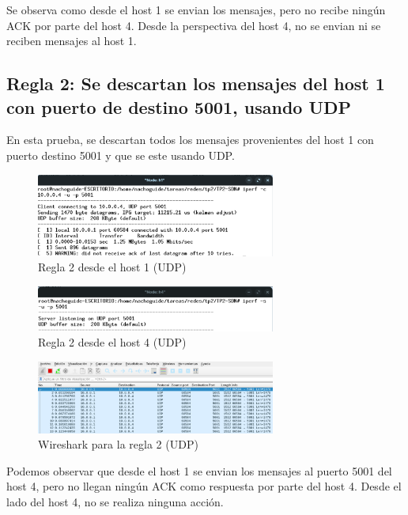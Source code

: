 \documentclass[titlepage,a4paper]{article}
\begin{document}
Se observa como desde el host 1 se envian los mensajes, pero no recibe ningún ACK por parte del host 4.
Desde la perspectiva del host 4, no se envian ni se reciben mensajes al host 1.


\subsection{Regla 2: Se descartan los mensajes del host 1 con puerto de destino 5001, usando UDP}
En esta prueba, se descartan todos los mensajes provenientes del host 1 con puerto destino 5001 y que se este usando UDP.

\begin{figure}[H]
    \centering
    \includegraphics[width=0.7\textwidth]{img/regla2_h1_udp.png}
    \caption{Regla 2 desde el host 1 (UDP)}
\end{figure}

\begin{figure}[H]
    \centering
    \includegraphics[width=0.7\textwidth]{img/regla2_h4_udp.png}
    \caption{Regla 2 desde el host 4 (UDP)}
\end{figure}

\begin{figure}[H]
    \centering
    \includegraphics[width=0.7\textwidth]{img/regla2_wireshark_udp.png}
    \caption{Wireshark para la regla 2 (UDP)}
\end{figure}

Podemos observar que desde el host 1 se envian los mensajes al puerto 5001 del host 4, pero no llegan ningún ACK como respuesta por parte del host 4.
Desde el lado del host 4, no se realiza ninguna acción.
\end{document}
